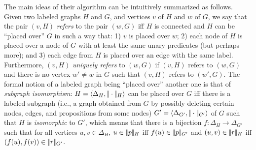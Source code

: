 The main ideas of their algorithm can be
intuitively summarized as follows.
Given two labeled graphs $H$ and $G$, and vertices $v$ of $H$
and $w$ of $G$, we say that the pair $(v,H)$ {\em refers}
to the pair $(w,G)$ iff $H$ is connected and $H$ can be ``placed
over'' $G$ in such a way that: 1) $v$ is placed over $w$; 2) each
node of $H$ is placed over a node of $G$ with at least the same
unary predicates (but perhaps more); and 3) each edge from $H$ is
placed over an edge with the same label. Furthermore, $(v,H)$ {\em
uniquely refers} to $(w,G)$ if $(v,H)$ refers to $(w,G)$ and there
is no vertex $w'\not=w$ in $G$ such that $(v,H)$ refers to $(w',G)$.
The formal notion of a labeled graph being ``placed over'' another
one is that of {\em subgraph isomorphism}:
$H=\langle \Delta_H,|\!|\cdot|\!|_H\rangle$ can be placed over
$G$ iff there is a labeled subgraph (i.e., a graph obtained from
$G$ by possibly deleting certain nodes, edges, and propositions from some nodes)
$G'=\langle \Delta_{G'},|\!|\cdot|\!|_{G'}\rangle$ of $G$ such that $H$ is {\em
isomorphic} to $G'$, which means that there is a
bijection $f:\Delta_{H}\to\Delta_{G'}$ such that for all vertices
$u,v\in \Delta_H$, $u\in|\!|p|\!|_{H}$ iff $f(u)\in|\!|p|\!|_{G'}$
and $(u,v)\in|\!|r|\!|_{H}$ iff $(f(u),f(v))\in|\!|r|\!|_{G'}$.
%
